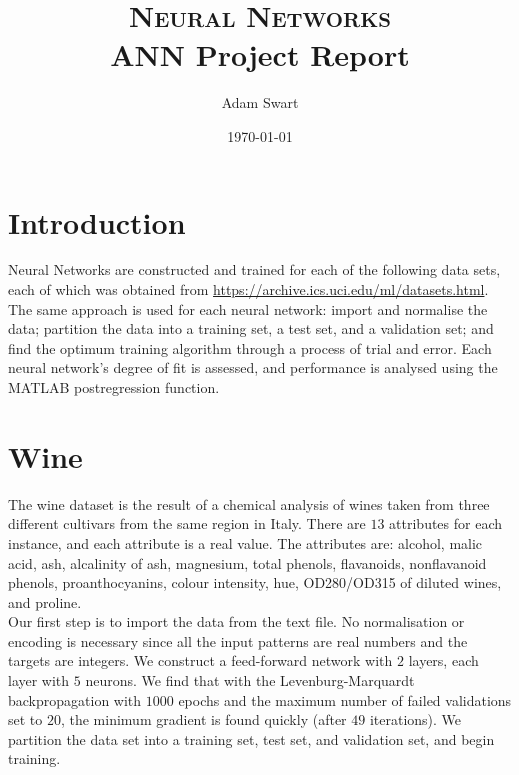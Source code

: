\documentclass{article}%
\title{
\textsc{Neural Networks} \\ [25pt]
\huge ANN Project Report \\ %
}
\author{Adam Swart} %
\date{\today} %
\begin{document}
\maketitle %
\section{Introduction}
Neural Networks are constructed and trained for each of the following data sets, each of which was obtained from \url{https://archive.ics.uci.edu/ml/datasets.html}. The same approach is used for each neural network: import and normalise the data; partition the data into a training set, a test set, and a validation set; and find the optimum training algorithm through a process of trial and error. Each neural network's degree of fit is assessed, and performance is analysed using the MATLAB postregression function.

\section{Wine} 
The wine dataset is the result of a chemical analysis of wines taken from three different cultivars from the same region in Italy. There are $13$ attributes for each instance, and each attribute is a real value. The attributes are: alcohol, malic acid, ash, alcalinity of ash, magnesium, total phenols, flavanoids, nonflavanoid phenols, proanthocyanins, colour intensity, hue, OD280/OD315 of diluted wines, and proline. 
\\
Our first step is to import the data from the text file. No normalisation or encoding is necessary since all the input patterns are real numbers and the targets are integers. We construct a feed-forward network with $2$ layers, each layer with $5$ neurons. We find that with the Levenburg-Marquardt backpropagation with $1000$ epochs and the maximum number of failed validations set to $20$, the minimum gradient is found quickly (after $49$ iterations). We partition the data set into a training set, test set, and validation set, and begin training.
\end{document}
